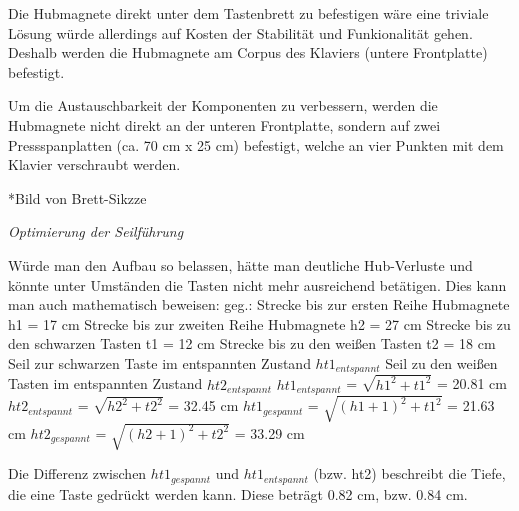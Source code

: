 Die Hubmagnete direkt unter dem Tastenbrett zu befestigen wäre eine triviale Lösung würde allerdings auf Kosten der Stabilität und Funkionalität gehen.
Deshalb werden die Hubmagnete am Corpus des Klaviers (untere Frontplatte) befestigt.

Um die Austauschbarkeit der Komponenten zu verbessern, werden die Hubmagnete nicht direkt an der unteren Frontplatte,
sondern auf zwei Pressspanplatten (ca. 70 cm x 25 cm) befestigt, welche an vier Punkten mit dem Klavier verschraubt werden.

*Bild von Brett-Sikzze

\textit{Optimierung der Seilführung}

Würde man den Aufbau so belassen, hätte man deutliche Hub-Verluste und könnte unter Umständen die Tasten nicht mehr ausreichend betätigen.
\newline
Dies kann man auch mathematisch beweisen:
\newline geg.:
\newline Strecke bis zur ersten Reihe Hubmagnete h1 = 17 cm
\newline Strecke bis zur zweiten Reihe Hubmagnete h2 = 27 cm
\newline Strecke bis zu den schwarzen Tasten t1 = 12 cm
\newline Strecke bis zu den weißen Tasten t2 = 18 cm
\newline Seil zur schwarzen Taste im entspannten Zustand $ht1_{entspannt}$
\newline Seil zu den weißen Tasten im entspannten Zustand $ht2_{entspannt}$
\newline $ht1_{entspannt}$ = $\sqrt {h1^{2} + t1^{2}}$ = 20.81 cm
\newline $ht2_{entspannt}$ = $\sqrt {h2^{2} + t2^{2}}$ = 32.45 cm
\newline $ht1_{gespannt}$ = $\sqrt {(h1 + 1) ^{2} + t1^{2}}$ = 21.63 cm
\newline $ht2_{gespannt}$ = $\sqrt {(h2 + 1)^{2} + t2^{2}}$ = 33.29 cm

Die Differenz zwischen $ht1_{gespannt}$ und $ht1_{entspannt}$ (bzw. ht2) beschreibt die Tiefe, die eine Taste gedrückt werden kann.
\newline Diese beträgt 0.82 cm, bzw. 0.84 cm.

